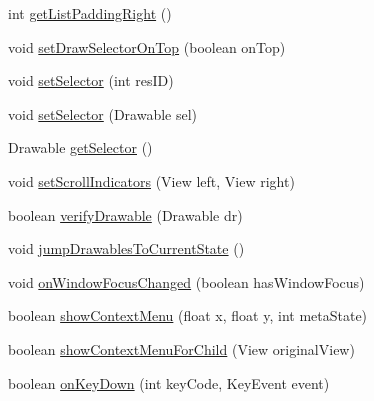 \begin{DoxyCompactItemize}
\item 
int \hyperlink{classit_1_1sephiroth_1_1android_1_1library_1_1widget_1_1_abs_h_list_view_a9fcd02d554edb88f79be034b91e0528e}{get\+List\+Padding\+Right} ()
\item 
void \hyperlink{classit_1_1sephiroth_1_1android_1_1library_1_1widget_1_1_abs_h_list_view_a8e4168b0270456f7d20447776c7841d0}{set\+Draw\+Selector\+On\+Top} (boolean on\+Top)
\item 
void \hyperlink{classit_1_1sephiroth_1_1android_1_1library_1_1widget_1_1_abs_h_list_view_aec92484fa1bc0c5213b623f3e7e1fbbb}{set\+Selector} (int res\+ID)
\item 
void \hyperlink{classit_1_1sephiroth_1_1android_1_1library_1_1widget_1_1_abs_h_list_view_ab7a28bd10b62cca24b39bb1ec5331745}{set\+Selector} (Drawable sel)
\item 
Drawable \hyperlink{classit_1_1sephiroth_1_1android_1_1library_1_1widget_1_1_abs_h_list_view_a6e3c39f3a58ba45b9c720648bea7086f}{get\+Selector} ()
\item 
void \hyperlink{classit_1_1sephiroth_1_1android_1_1library_1_1widget_1_1_abs_h_list_view_ae1bb28f4c23c654864ce3eee9925e74c}{set\+Scroll\+Indicators} (View left, View right)
\item 
boolean \hyperlink{classit_1_1sephiroth_1_1android_1_1library_1_1widget_1_1_abs_h_list_view_a906f78762fb0489f6766bfc50ea58716}{verify\+Drawable} (Drawable dr)
\item 
void \hyperlink{classit_1_1sephiroth_1_1android_1_1library_1_1widget_1_1_abs_h_list_view_abc2453cec5f7498be594380a9f29e14c}{jump\+Drawables\+To\+Current\+State} ()
\item 
void \hyperlink{classit_1_1sephiroth_1_1android_1_1library_1_1widget_1_1_abs_h_list_view_ad6cfc4c63a99d8b587cb04eb3ede82f7}{on\+Window\+Focus\+Changed} (boolean has\+Window\+Focus)
\item 
boolean \hyperlink{classit_1_1sephiroth_1_1android_1_1library_1_1widget_1_1_abs_h_list_view_af8dc59ffdbea4bac0082292689a6a227}{show\+Context\+Menu} (float x, float y, int meta\+State)
\item 
boolean \hyperlink{classit_1_1sephiroth_1_1android_1_1library_1_1widget_1_1_abs_h_list_view_a039314ca511ff2d9f48b98c2eb829d3b}{show\+Context\+Menu\+For\+Child} (View original\+View)
\item 
boolean \hyperlink{classit_1_1sephiroth_1_1android_1_1library_1_1widget_1_1_abs_h_list_view_aa9027910288b23df74f4858ece595ffc}{on\+Key\+Down} (int key\+Code, Key\+Event event)
\item 

\end{DoxyCompactItemize}
